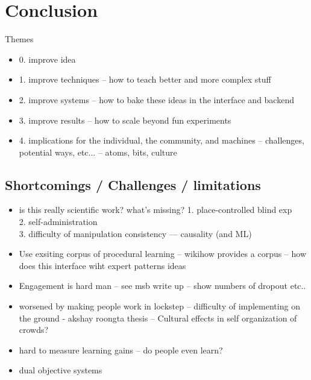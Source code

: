 
\chapter{Conclusion}

Themes
\begin{itemize}
\item 0. improve idea
\item 1. improve techniques  -- how to teach better and more complex stuff
\item 2. improve systems -- how to bake these ideas in the interface and backend
\item 3. improve results -- how to scale beyond fun experiments
\item 4. implications for the individual, the community, and machines -- challenges, potential ways, etc... -- atoms, bits, culture
\end{itemize}

\section{Shortcomings / Challenges / limitations}
\begin{itemize}
\item is this really scientific work? what’s missing?
1. place-controlled blind exp \\
2. self-administration \\
3. difficulty of manipulation consistency 
---  causality (and ML)   
\item Use exsiting corpus of procedural learning -- wikihow provides a corpus -- how does this interface wiht expert patterns ideas
\item Engagement is hard man -- see msb write up -- show numbers of dropout etc..
\item worsened by making people work in lockstep --  difficulty of implementing on the ground - akshay roongta thesis -- Cultural effects in self organization of crowds?
\item hard to measure learning gains -- do people even learn?
\item dual objective systems

\end{itemize}


